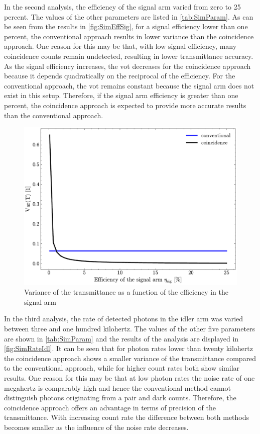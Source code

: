 In the second analysis, the efficiency of the signal arm varied from zero to 25 percent. The values of the other parameters are listed in \autoref{tab:SimParam}. As can be seen from the results in \autoref{fig:SimEffSig}, for a signal efficiency lower than one percent, the conventional approach results in lower variance than the coincidence approach. One reason for this may be that, with low signal efficiency, many coincidence counts remain undetected, resulting in lower transmittance accuracy. As the signal efficiency increases, the \acrshort{vot} decreases for the coincidence approach because it depends quadratically on the reciprocal of the efficiency. For the conventional approach, the \acrshort{vot} remains constant because the signal arm does not exist in this setup. Therefore, if the signal arm efficiency is greater than one percent, the coincidence approach is expected to provide more accurate results than the conventional approach.
\begin{figure}[tb!]
	\centering
	\includegraphics[width=.7\textwidth]{Images/SimulationSweepEffSig.pdf}
	\caption{Variance of the transmittance as a function of the efficiency in the signal arm}
	\label{fig:SimEffSig}
\end{figure}\newline
In the third analysis, the rate of detected photons in the idler arm was varied between three and one hundred kilohertz. The values of the other five parameters are shown in \autoref{tab:SimParam} and the results of the analysis are displayed in \autoref{fig:SimRateIdl}. It can be seen that for photon rates lower than twenty kilohertz the coincidence approach shows a smaller variance of the transmittance compared to the conventional approach, while for higher count rates both show similar results. One reason for this may be that at low photon rates the noise rate of one megahertz is comparably high and hence the conventional method cannot distinguish photons originating from a pair and dark counts. Therefore, the coincidence approach offers an advantage in terms of precision of the transmittance. With increasing count rate the difference between both methods becomes smaller as the influence of the noise rate decreases. 
